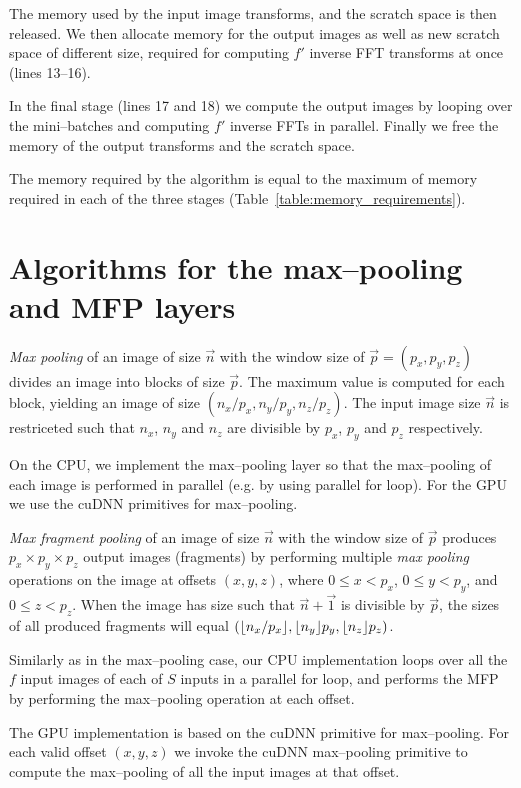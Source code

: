 \documentclass[conference]{./IEEEtran/IEEEtran}
\DeclarePairedDelimiter{\floor}{\lfloor}{\rfloor}
\begin{document}
  The memory used by the input image transforms, and the scratch space
  is then released.  We then allocate memory for the output images as
  well as new scratch space of different size, required for computing
  $f'$ inverse FFT transforms at once (lines 13--16).

  In the final stage (lines 17 and 18) we compute the output images by
  looping over the mini--batches and computing $f'$ inverse FFTs in
  parallel.  Finally we free the memory of the output transforms and
  the scratch space.

  The memory required by the algorithm is equal to the maximum of
  memory required in each of the three stages
  (Table~\ref{table:memory_requirements}).

\section{Algorithms for the max--pooling and MFP layers}

  \emph{Max pooling} of an image of size $\vec{n}$ with the window
  size of $\vec{p} = (p_x,p_y,p_z)$ divides an image into blocks of
  size $\vec{p}$.  The maximum value is computed for each block,
  yielding an image of size $(n_x/p_x,n_y/p_y,n_z/p_z)$.  The input
  image size $\vec{n}$ is restriceted such that $n_x$, $n_y$ and $n_z$
  are divisible by $p_x$, $p_y$ and $p_z$ respectively.

  On the CPU, we implement the max--pooling layer so that the
  max--pooling of each image is performed in parallel (e.g. by using
  parallel for loop).  For the GPU we use the cuDNN primitives for
  max--pooling.

  \emph{Max fragment pooling} of an image of size $\vec{n}$ with the
  window size of $\vec{p}$ produces $p_x \times p_y \times p_z$ output
  images (fragments) by performing multiple \emph{max pooling}
  operations on the image at offsets $(x,y,z)$, where $0 \le x < p_x$,
  $0 \le y < p_y$, and $0 \le z < p_z$.  When the image has size such
  that $\vec{n} + \vec{1}$ is divisible by $\vec{p}$, the sizes of all
  produced fragments will equal
  $(\floor{n_x/p_x},\floor{n_y}{p_y},\floor{n_z}{p_z})$.

  Similarly as in the max--pooling case, our CPU implementation loops
  over all the $f$ input images of each of $S$ inputs in a parallel
  for loop, and performs the MFP by performing the
  max--pooling operation at each offset.

  The GPU implementation is based on the cuDNN primitive for
  max--pooling.  For each valid offset $(x,y,z)$ we invoke the cuDNN
  max--pooling primitive to compute the max--pooling of all the input
  images at that offset.
\end{document}
